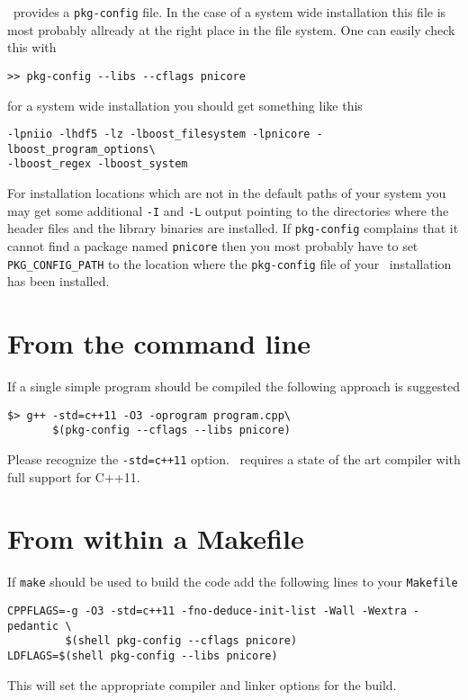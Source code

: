 \libpnicore\ provides a {\tt pkg-config} file. In the case of a system wide
installation this file is most probably allready at the right place in the file
system. One can easily check this with 
\begin{verbatim}
>> pkg-config --libs --cflags pnicore 
\end{verbatim}
for a system wide installation you should get something like this
\begin{verbatim}
-lpniio -lhdf5 -lz -lboost_filesystem -lpnicore -lboost_program_options\ 
-lboost_regex -lboost_system 
\end{verbatim}
For installation locations which are not in the default paths of your system you
may get some additional {\tt -I} and {\tt -L} output pointing to the directories
where the header files and the library binaries are installed.
If {\tt pkg-config} complains that it cannot find a package named {\tt pnicore}
then you most probably have to set {\tt PKG\_CONFIG\_PATH} to the location where 
the {\tt pkg-config} file of your \libpnicore\ installation has been installed. 

\section{From the command line}

If a single simple program should be compiled the following approach is
suggested 
\begin{verbatim}
$> g++ -std=c++11 -O3 -oprogram program.cpp\
       $(pkg-config --cflags --libs pnicore)
\end{verbatim}
Please recognize the {\tt -std=c++11} option. \libpnicore\ requires a state of
the art compiler with full support for C++11.

\section{From within a Makefile}

If {\tt make} should be used to build the code add the following lines to your
{\tt Makefile}

\begin{verbatim}
CPPFLAGS=-g -O3 -std=c++11 -fno-deduce-init-list -Wall -Wextra -pedantic \
		 $(shell pkg-config --cflags pnicore) 
LDFLAGS=$(shell pkg-config --libs pnicore)
\end{verbatim}
This will set the appropriate compiler and linker options for the build.

